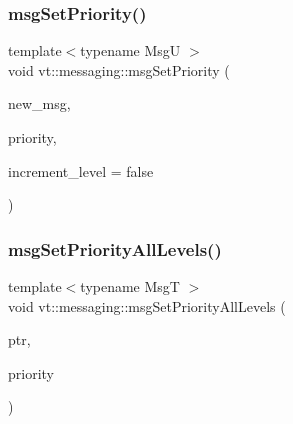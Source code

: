 \mbox{\label{namespacevt_1_1messaging_ab8115ae64f9c390e7a92f3f02aea8454}} 
\subsubsection{\texorpdfstring{msg\+Set\+Priority()}{msgSetPriority()}}
{\footnotesize\ttfamily template$<$typename MsgU $>$ \\
void vt\+::messaging\+::msg\+Set\+Priority (\begin{DoxyParamCaption}\item[{MsgU}]{new\+\_\+msg,  }\item[{\hyperlink{namespacevt_a86bff9f556eb761b27fc8600d006ac04}{Priority\+Type}}]{priority,  }\item[{bool}]{increment\+\_\+level = {\ttfamily false} }\end{DoxyParamCaption})}

\mbox{\label{namespacevt_1_1messaging_aae494e42c66a7b35346fd31d0100ebeb}} 
\subsubsection{\texorpdfstring{msg\+Set\+Priority\+All\+Levels()}{msgSetPriorityAllLevels()}}
{\footnotesize\ttfamily template$<$typename MsgT $>$ \\
void vt\+::messaging\+::msg\+Set\+Priority\+All\+Levels (\begin{DoxyParamCaption}\item[{MsgT}]{ptr,  }\item[{\hyperlink{namespacevt_a86bff9f556eb761b27fc8600d006ac04}{Priority\+Type}}]{priority }\end{DoxyParamCaption})}

\mbox{\label{namespacevt_1_1messaging_a9cbb4989b799eaba6ab9b8dde9e3cf14}} 

